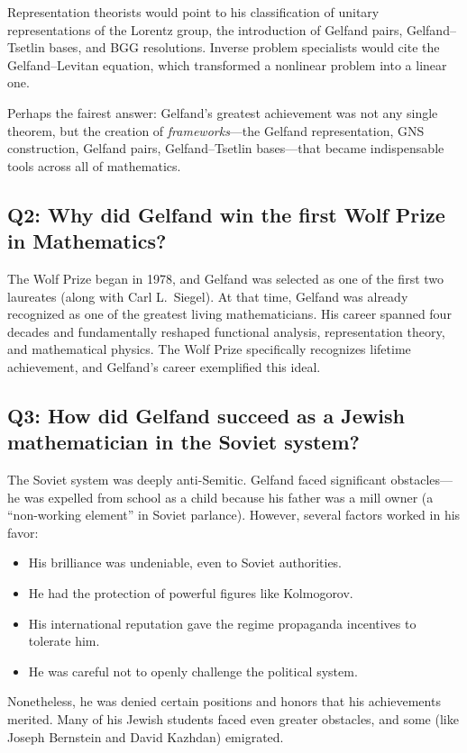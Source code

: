Representation theorists would point to his classification of unitary representations of the Lorentz group, the introduction of Gelfand pairs, Gelfand--Tsetlin bases, and BGG resolutions. Inverse problem specialists would cite the Gelfand--Levitan equation, which transformed a nonlinear problem into a linear one.

Perhaps the fairest answer: Gelfand's greatest achievement was not any single theorem, but the creation of \textit{frameworks}---the Gelfand representation, GNS construction, Gelfand pairs, Gelfand--Tsetlin bases---that became indispensable tools across all of mathematics.

\subsection*{Q2: Why did Gelfand win the first Wolf Prize in Mathematics?}

The Wolf Prize began in 1978, and Gelfand was selected as one of the first two laureates (along with Carl L.\ Siegel). At that time, Gelfand was already recognized as one of the greatest living mathematicians. His career spanned four decades and fundamentally reshaped functional analysis, representation theory, and mathematical physics. The Wolf Prize specifically recognizes lifetime achievement, and Gelfand's career exemplified this ideal.

\subsection*{Q3: How did Gelfand succeed as a Jewish mathematician in the Soviet system?}

The Soviet system was deeply anti-Semitic. Gelfand faced significant obstacles---he was expelled from school as a child because his father was a mill owner (a ``non-working element'' in Soviet parlance). However, several factors worked in his favor:
\begin{itemize}
    \item His brilliance was undeniable, even to Soviet authorities.
    \item He had the protection of powerful figures like Kolmogorov.
    \item His international reputation gave the regime propaganda incentives to tolerate him.
    \item He was careful not to openly challenge the political system.
\end{itemize}
Nonetheless, he was denied certain positions and honors that his achievements merited. Many of his Jewish students faced even greater obstacles, and some (like Joseph Bernstein and David Kazhdan) emigrated.

